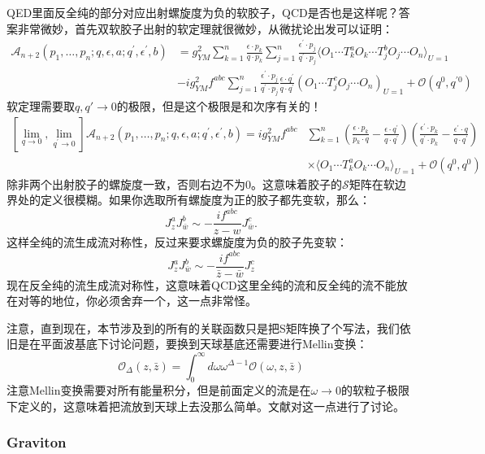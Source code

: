QED里面反全纯的部分对应出射螺旋度为负的软胶子，QCD是否也是这样呢？答案非常微妙，首先双软胶子出射的软定理就很微妙，从微扰论出发可以证明：
\begin{equation}
	\begin{aligned}\mathcal{A}_{n+2}(p_1,\ldots,p_n;q,\epsilon,a;q^{\prime},\epsilon^{\prime},b)&=g_{YM}^2\sum_{k=1}^n\frac{\epsilon\cdot p_k}{q\cdot p_k}\sum_{j=1}^n\frac{\epsilon^{\prime}\cdot p_j}{q^{\prime}\cdot p_j}\langle O_1\cdots T_k^aO_k\cdots T_j^bO_j\cdots O_n\rangle_{U=1}\\&-ig_{YM}^2f^{abc}\sum_{j=1}^n\frac{\epsilon^{\prime}\cdot p_j}{q^{\prime}\cdot p_j}\frac{\epsilon\cdot q^{\prime}}{q\cdot q^{\prime}}(O_1\cdots T_j^cO_j\cdots O_n)_{U=1}+\mathcal{O}(q^0,q^{\prime0})\end{aligned}
\end{equation}
软定理需要取$q,q\prime\to0$的极限，但是这个极限是和次序有关的！
\begin{equation}
	\begin{aligned}\left[\lim_{q\to0},\lim_{q^{\prime}\to0}\right]\mathcal{A}_{n+2}(p_1,\ldots,p_n;q,\epsilon,a;q^{\prime},\epsilon^{\prime},b)=ig_{YM}^2f^{abc}&\sum_{k=1}^n\left(\frac{\epsilon\cdot p_k}{p_k\cdot q}-\frac{\epsilon\cdot q^{\prime}}{q\cdot q^{\prime}}\right)\left(\frac{\epsilon^{\prime}\cdot p_k}{q^{\prime}\cdot p_k}-\frac{\epsilon^{\prime}\cdot q}{q\cdot q^{\prime}}\right)\\&\times\langle O_1\cdots T_k^aO_k\cdots O_n\rangle_{U=1}+\mathcal{O}\left(q^0,q^0\right)\end{aligned}
\end{equation}
除非两个出射胶子的螺旋度一致，否则右边不为0。这意味着胶子的$\mathcal{S}$矩阵在软边界处的定义很模糊。如果你选取所有螺旋度为正的胶子都先变软，那么：
\begin{equation}\label{51.3}
	J_z^aJ_{\bar{w}}^b\sim-\frac{if^{abc}}{z-w}J_{\bar{w}}^c.
\end{equation}
这样全纯的流生成流对称性，反过来要求螺旋度为负的胶子先变软：
\begin{equation}
	J_z^aJ_{\bar{w}}^b\sim-\frac{if^{abc}}{\bar{z}-\bar{w}}J_z^c
\end{equation}
现在反全纯的流生成流对称性，这意味着QCD这里全纯的流和反全纯的流不能放在对等的地位，你必须舍弃一个，这一点非常怪。\cite{He:2015zea}

注意，直到现在，本节涉及到的所有的关联函数只是把S矩阵换了个写法，我们依旧是在平面波基底下讨论问题，要换到天球基底还需要进行Mellin变换：
\begin{equation}
	\mathcal{O}_\Delta(z,\bar{z})=\int_0^\infty d\omega\omega^{\Delta-1}\mathcal{O}(\omega,z,\bar{z})
\end{equation}
注意Mellin变换需要对所有能量积分，但是前面定义的流是在$\omega\to0$的软粒子极限下定义的，这意味着把流放到天球上去没那么简单。文献\cite{Guevara:2021abz,Strominger:2021mtt,Adamo:2019ipt,Guevara:2019ypd}对这一点进行了讨论。
\subsubsection{Graviton}

